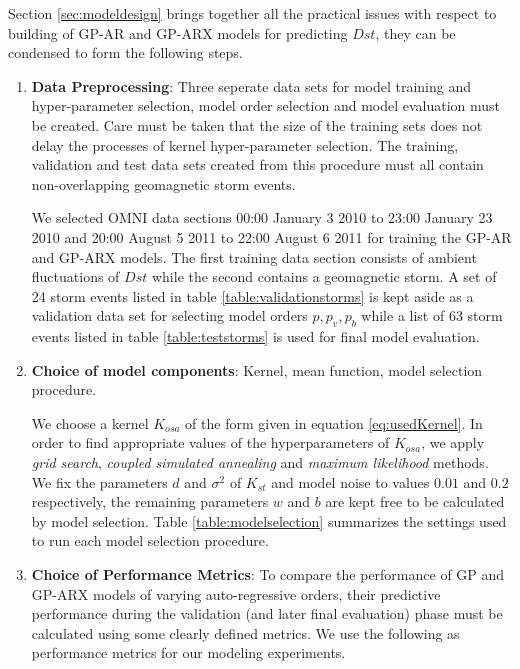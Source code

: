 \documentclass{article}
\begin{document}
Section \ref{sec:modeldesign} brings together all the practical issues
with respect to building of GP-AR and GP-ARX models for predicting
$Dst$, they can be condensed to form the following steps.

\begin{enumerate}

\item \textbf{Data Preprocessing}: Three seperate data sets for model
  training and hyper-parameter selection, model order selection and
  model evaluation must be created. Care must be taken that the size
  of the training sets does not delay the processes of kernel
  hyper-parameter selection. The training, validation and test data
  sets created from this procedure must all contain non-overlapping
  geomagnetic storm events. 

  We selected OMNI data sections 00:00 January 3 2010 to 23:00 January
  23 2010 and 20:00 August 5 2011 to 22:00 August 6 2011 for training
  the GP-AR and GP-ARX models. The first training data section
  consists of ambient fluctuations of $Dst$ while the second contains
  a geomagnetic storm. A set of 24 storm events listed in table
  \ref{table:validationstorms} is kept aside as a validation data set
  for selecting model orders $p, p_v, p_b$ while a list of 63 storm
  events listed in table \ref{table:teststorms} is used for final
  model evaluation.


\item \textbf{Choice of model components}:  Kernel, mean function, model selection procedure. 

  We choose a kernel $K_{osa}$ of the form given in equation
  \ref{eq:usedKernel}. In order to find appropriate values of the
  hyperparameters of $K_{osa}$, we apply \emph{grid search},
  \emph{coupled simulated annealing} and \emph{maximum likelihood}
  methods. We fix the parameters $d$ and $\sigma^2$ of $K_{st}$ and
  model noise to values $0.01$ and $0.2$ respectively, the remaining
  parameters $w$ and $b$ are kept free to be calculated by model
  selection. Table \ref{table:modelselection} summarizes the settings
  used to run each model selection procedure.

\item \textbf{Choice of Performance Metrics}: To compare the
  performance of GP and GP-ARX models of varying auto-regressive
  orders, their predictive performance during the validation (and
  later final evaluation) phase must be calculated using some clearly
  defined metrics. We use the following as performance metrics for our
  modeling experiments.


\end{enumerate}
\end{document}
